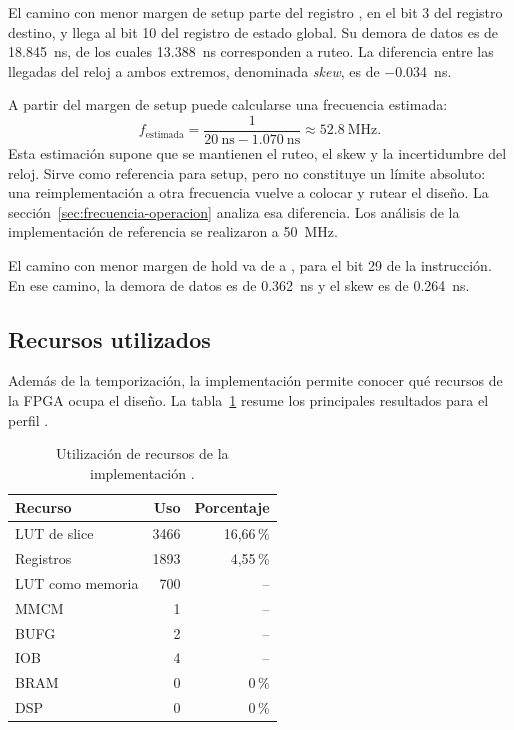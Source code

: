 El camino con menor margen de setup parte del registro , en el bit
3 del registro destino, y llega al bit 10 del registro de estado global. Su
demora de datos es de \SI{18.845}{\nano\second}, de los cuales
\SI{13.388}{\nano\second} corresponden a ruteo. La diferencia entre las
llegadas del reloj a ambos extremos, denominada \emph{skew}, es de
\SI{-0.034}{\nano\second}.

A partir del margen de setup puede calcularse una frecuencia estimada:
\[
  f_{\mathrm{estimada}} =
  \frac{1}{\SI{20}{\nano\second}-\SI{1.070}{\nano\second}}
  \approx \SI{52.8}{\mega\hertz}.
\]
Esta estimación supone que se mantienen el ruteo, el skew y la incertidumbre
del reloj. Sirve como referencia para setup, pero no constituye un límite
absoluto: una reimplementación a otra frecuencia vuelve a colocar y rutear el
diseño. La sección~\ref{sec:frecuencia-operacion} analiza esa diferencia. Los
análisis de la implementación de referencia se realizaron a
\SI{50}{\mega\hertz}.

El camino con menor margen de hold va de  a , para el
bit 29 de la instrucción. En ese camino, la demora de datos es de
\SI{0.362}{\nano\second} y el skew es de \SI{0.264}{\nano\second}.

\subsection{Recursos utilizados}

Además de la temporización, la implementación permite conocer qué recursos de
la FPGA ocupa el diseño. La tabla~\ref{tab:recursos} resume los principales
resultados para el perfil .

\begin{table}[H]
  \centering
  \small
  \begin{tabular}{lrr}
    \toprule
    \textbf{Recurso} & \textbf{Uso} & \textbf{Porcentaje} \\
    \midrule
    LUT de slice & 3466 & 16,66\,\% \\
    Registros & 1893 & 4,55\,\% \\
    LUT como memoria & 700 & -- \\
    MMCM & 1 & -- \\
    BUFG & 2 & -- \\
    IOB & 4 & -- \\
    BRAM & 0 & 0\,\% \\
    DSP & 0 & 0\,\% \\
    \bottomrule
  \end{tabular}
  \caption{Utilización de recursos de la implementación .}
  \label{tab:recursos}
\end{table}

